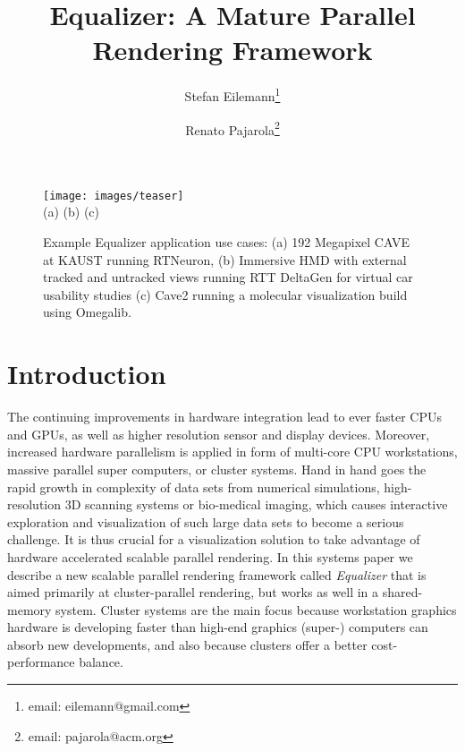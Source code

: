\documentclass[journal]{vgtc}                %
\title{Equalizer: A Mature Parallel Rendering Framework}
\author{Stefan Eilemann\thanks{email: eilemann@gmail.com} \\ %
\and Renato Pajarola\thanks{email: pajarola@acm.org}}
\affiliation{\scriptsize Visualization and MultiMedia Lab \\ Department of Informatics \\ University of Z\"urich}
\begin{document}

\maketitle

\begin{figure*}[ht]\center
  \texttt{[image: images/teaser]} \\
  (a) \hfil \hfil (b) \hfil \hfil (c)
  \vspace{-2mm}
  \caption{Example Equalizer application use cases: (a) 192 Megapixel CAVE at
    KAUST running RTNeuron, (b) Immersive HMD with external tracked and
    untracked views running RTT DeltaGen for virtual car usability studies (c)
    Cave2 running a molecular visualization build using Omegalib.}
  \label{FIG_teaser}
\end{figure*}

\section{Introduction}

The continuing improvements in hardware integration lead to ever faster CPUs and GPUs, as well as higher resolution sensor and display devices. Moreover, increased hardware parallelism is applied in form of multi-core CPU workstations, massive parallel super computers, or cluster systems. Hand in hand goes the rapid growth in complexity of data sets from numerical simulations, high-resolution 3D scanning systems or bio-medical imaging, which causes interactive exploration and visualization of such large data sets to become a serious challenge. It is thus crucial for a visualization solution to take advantage of hardware accelerated scalable parallel rendering. In this systems paper we describe a new scalable parallel rendering framework called {\em Equalizer} that is aimed primarily at cluster-parallel rendering, but works as well in a shared-memory system. Cluster systems are the main focus  because workstation graphics hardware is developing faster than high-end graphics (super-) computers can absorb new developments, and also because clusters offer a better cost-performance balance.
\end{document}

